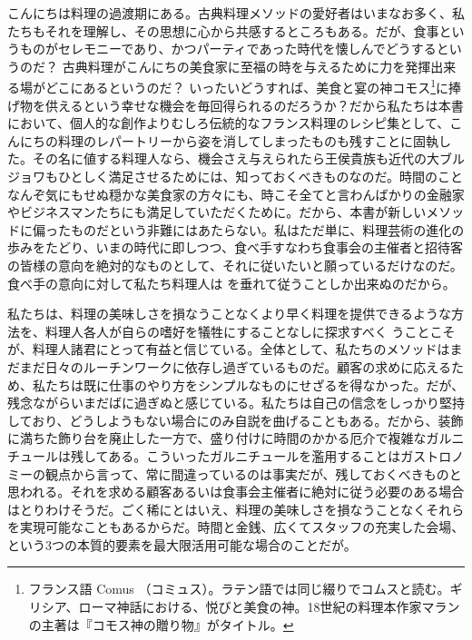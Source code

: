 \begin{Main}
こんにちは料理の過渡期にある。古典料理メソッドの愛好者はいまなお多く、私たちもそれを理解し、その思想に心から共感するところもある。だが、食事というものがセレモニーであり、かつパーティであった時代を懐しんでどうするというのだ？
古典料理がこんにちの美食家に至福の時を与えるために力を発揮出来る場がどこにあるというのだ？
いったいどうすれば、美食と宴の神コモス\footnote{フランス語 Comus
  （コミュス）。ラテン語では同じ綴りでコムスと読む。ギリシア、ローマ神話における、悦びと美食の神。18世紀の料理本作家マランの主著は『コモス神の贈り物』がタイトル。}に捧げ物を供えるという幸せな機会を毎回得られるのだろうか？だから私たちは本書において、個人的な創作よりむしろ伝統的なフランス料理のレシピ集として、こんにちの料理のレパートリーから姿を消してしまったものも残すことに固執した。その名に値する料理人なら、機会さえ与えられたら王侯貴族も近代の大ブルジョワもひとしく満足させるためには、知っておくべきものなのだ。時間のことなんぞ気にもせぬ穏かな美食家の方々にも、時こそ全てと言わんばかりの金融家やビジネスマンたちにも満足していただくために。だから、本書が新しいメソッドに偏ったものだという非難にはあたらない。私はただ単に、料理芸術の進化の歩みをたどり、いまの時代に即しつつ、食べ手すなわち食事会の主催者と招待客の皆様の意向を絶対的なものとして、それに従いたいと願っているだけなのだ。食べ手の意向に対して私たち料理人は
を垂れて従うことしか出来ぬのだから。

私たちは、料理の美味しさを損なうことなくより早く料理を提供できるような方法を、料理人各人が自らの嗜好を犠牲にすることなしに探求すべく
うことこそが、料理人諸君にとって有益と信じている。全体として、私たちのメソッドはまだまだ日々のルーチンワークに依存し過ぎているものだ。顧客の求めに応えるため、私たちは既に仕事のやり方をシンプルなものにせざるを得なかった。だが、残念ながらいまだばに過ぎぬと感じている。私たちは自己の信念をしっかり堅持しており、どうしようもない場合にのみ自説を曲げることもある。だから、装飾に満ちた飾り台を廃止した一方で、盛り付けに時間のかかる厄介で複雑なガルニチュールは残してある。こういったガルニチュールを濫用することはガストロノミーの観点から言って、常に間違っているのは事実だが、残しておくべきものと思われる。それを求める顧客あるいは食事会主催者に絶対に従う必要のある場合はとりわけそうだ。ごく稀にとはいえ、料理の美味しさを損なうことなくそれらを実現可能なこともあるからだ。時間と金銭、広くてスタッフの充実した会場、という3つの本質的要素を最大限活用可能な場合のことだが。


\end{Main}
